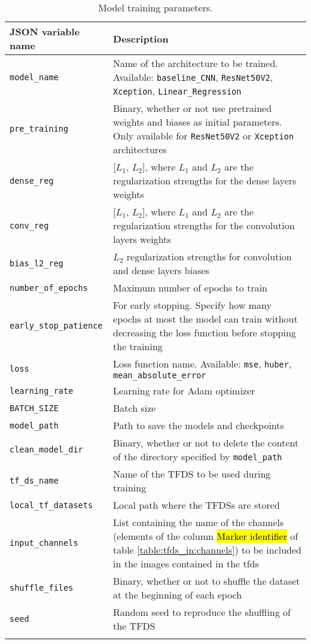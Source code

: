 \begin{longtable}{>{\centering\arraybackslash}m{\mylengtha} | m{\mylengthb}}
    \hline
    JSON variable name & Description \\
    \hline
    \texttt{model\_name} & Name of the architecture to be trained. Available: \texttt{baseline\_CNN}, \texttt{ResNet50V2}, \texttt{Xception}, \texttt{Linear\_Regression} \\
    \hline
    \texttt{pre\_training} & Binary, whether or not use pretrained weights and biases as initial parameters. Only available for \texttt{ResNet50V2} or \texttt{Xception} architectures \\
    \hline
    \texttt{dense\_reg} & [$L_1$, $L_2$], where $L_1$ and $L_2$ are the regularization strengths for the dense layers weights\\
    \hline
    \texttt{conv\_reg} & [$L_1$, $L_2$], where $L_1$ and $L_2$ are the regularization strengths for the convolution layers weights \\
    \hline
    \texttt{bias\_l2\_reg} & $L_2$ regularization strengths for convolution and dense layers biases \\
    \hline
    \texttt{number\_of\_epochs} & Maximum number of epochs to train \\
    \hline
    \texttt{early\_stop\_patience} & For early stopping. Specify how many epochs at most the model can train without decreasing the loss function before stopping the training \\
    \hline
    \texttt{loss} & Loss function name. Available: \texttt{mse}, \texttt{huber}, \texttt{mean\_absolute\_error} \\
    \hline
    \texttt{learning\_rate} & Learning rate for Adam optimizer \\
    \hline
    \texttt{BATCH\_SIZE} & Batch size \\
    \hline
    \texttt{model\_path} & Path to save the models and checkpoints \\
    \hline
    \texttt{clean\_model\_dir} & Binary, whether or not to delete the content of the directory specified by \texttt{model\_path} \\
    \hline
    \texttt{tf\_ds\_name} & Name of the TFDS to be used during training\\
    \hline
    \texttt{local\_tf\_datasets} & Local path where the TFDSs are stored \\
    \hline
    \texttt{input\_channels} & List containing the name of the channels (elements of the column \hl{Marker identifier} of table \ref{table:tfds_in:channels}) to be included in the images contained in the \gls{tfds} \\
    \hline
    \texttt{shuffle\_files} & Binary, whether or not to shuffle the dataset at the beginning of each epoch \\
    \hline
    \texttt{seed} & Random seed to reproduce the shuffling of the TFDS \\
    \hline
  \caption{Model training parameters.}
  \label{table:model_train_in:params}
\end{longtable}

